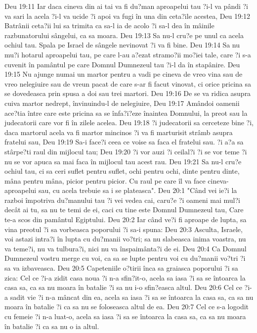 Deu 19:11  Iar daca cineva din ai tai va fi du?man aproapelui tau ?i-l va pândi ?i va sari la acela ?i-l va ucide ?i apoi va fugi în una din ceta?ile acestea,
Deu 19:12  Batrânii ceta?ii lui sa trimita ca sa-l ia de acolo ?i sa-l dea în mâinile razbunatorului sângelui, ca sa moara.
Deu 19:13  Sa nu-l cru?e pe unul ca acela ochiul tau. Spala pe Israel de sângele nevinovat ?i va fi bine.
Deu 19:14  Sa nu mu?i hotarul aproapelui tau, pe care l-au a?ezat stramo?ii mo?iei tale, care ?i s-a cuvenit în pamântul pe care Domnul Dumnezeul tau ?i-l da în stapânire.
Deu 19:15  Nu ajunge numai un martor pentru a vadi pe cineva de vreo vina sau de vreo nelegiuire sau de vreun pacat de care s-ar fi facut vinovat, ci orice pricina sa se dovedeasca prin spusa a doi sau trei martori.
Deu 19:16  De se va ridica asupra cuiva martor nedrept, învinuindu-l de nelegiuire,
Deu 19:17  Amândoi oamenii ace?tia între care este pricina sa se înfa?i?eze înaintea Domnului, la preot sau la judecatorii care vor fi în zilele acelea.
Deu 19:18  ?i judecatorii sa cerceteze bine ?i, daca martorul acela va fi martor mincinos ?i va fi marturisit strâmb asupra fratelui sau,
Deu 19:19  Sa-i face?i ceea ce voise sa faca el fratelui sau. ?i a?a sa stârpe?ti raul din mijlocul tau;
Deu 19:20  ?i vor auzi ?i ceilal?i ?i se vor teme ?i nu se vor apuca sa mai faca în mijlocul tau acest rau.
Deu 19:21  Sa nu-l cru?e ochiul tau, ci sa ceri suflet pentru suflet, ochi pentru ochi, dinte pentru dinte, mâna pentru mâna, picior pentru picior. Cu raul pe care îl va face cineva-aproapelui sau, cu acela trebuie sa i se plateasca".
Deu 20:1  "Când vei ie?i la razboi împotriva du?manului tau ?i vei vedea cai, caru?e ?i oameni mai mul?i decât ai tu, sa nu te temi de ei, caci cu tine este Domnul Dumnezeul tau, Care te-a scos din pamântul Egiptului.
Deu 20:2  Iar când ve?i fi aproape de lupta, sa vina preotul ?i sa vorbeasca poporului ?i sa-i spuna:
Deu 20:3  Asculta, Israele, voi astazi intra?i în lupta cu du?manii vo?tri; sa nu slabeasca inima voastra, nu va teme?i, nu va tulbura?i, nici nu va înspaimânta?i de ei.
Deu 20:4  Ca Domnul Dumnezeul vostru merge cu voi, ca sa se lupte pentru voi cu du?manii vo?tri ?i sa va izbaveasca.
Deu 20:5  Capeteniile o?tirii înca sa graiasca poporului ?i sa zica: Cel ce ?i-a zidit casa noua ?i n-a sfin?it-o, acela sa iasa ?i sa se întoarca la casa sa, ca sa nu moara în batalie ?i sa nu i-o sfin?easca altul.
Deu 20:6  Cel ce ?i-a sadit vie ?i n-a mâncat din ea, acela sa iasa ?i sa se întoarca la casa sa, ca sa nu moara în batalie ?i ca sa nu se foloseasca altul de ea.
Deu 20:7  Cel ce s-a logodit cu femeie ?i n-a luat-o, acela sa iasa ?i sa se întoarca la casa sa, ca sa nu moara în batalie ?i ca sa nu o ia altul.
